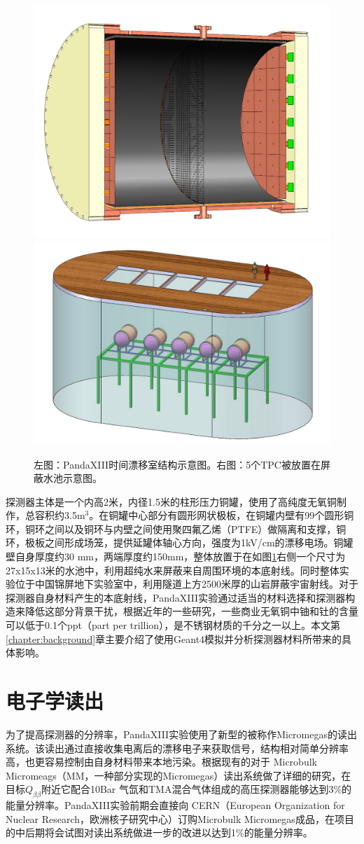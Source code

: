 \begin{figure}[tbp]
    \centering
    \includegraphics[width=0.4\columnwidth]{pic/fig1.png}
    \includegraphics[width=0.4\columnwidth]{pic/fig2.jpg}
    \caption{左图：PandaXIII时间漂移室结构示意图。右图：5个TPC被放置在屏蔽水池示意图。\supercite{cdr}}
    \label{fig:detector}
\end{figure}
    
探测器主体是一个内高2米，内径1.5米的柱形压力铜罐，使用了高纯度无氧铜制作，总容积约3.5m$^3$。在铜罐中心部分有圆形网状极板，在铜罐内壁有99个圆形铜环，铜环之间以及铜环与内壁之间使用聚四氟乙烯（PTFE）做隔离和支撑，铜环，极板之间形成场笼，提供延罐体轴心方向，强度为1kV/cm的漂移电场。铜罐壁自身厚度约30
mm，两端厚度约150mm，整体放置于在如图\ref{fig:detector}右侧一个尺寸为27x15x13米的水池中，利用超纯水来屏蔽来自周围环境的本底射线。同时整体实验位于中国锦屏地下实验室中，利用隧道上方2500米厚的山岩屏蔽宇宙射线。对于探测器自身材料产生的本底射线，PandaXIII实验通过适当的材料选择和探测器构造来降低这部分背景干扰，根据近年的一些研究，一些商业无氧铜中铀和钍的含量可以低于0.1个ppt（part per trillion）\supercite{abgrall2016majorana}，是不锈钢材质的千分之一以上。本文第\ref{chapter:background}章主要介绍了使用Geant4模拟并分析探测器材料所带来的具体影响。

\section{电子学读出}

为了提高探测器的分辨率，PandaXIII实验使用了新型的被称作Micromegas的读出系统。该读出通过直接收集电离后的漂移电子来获取信号，结构相对简单分辨率高，也更容易控制由自身材料带来本地污染。根据现有的对于 Microbulk Micromeags（MM，一种部分实现的Micromegas）读出系统做了详细的研究，在目标$Q_{\beta\beta}$附近它配合10Bar
气氙和TMA混合气体组成的高压探测器能够达到3\%的能量分辨率。PandaXIII实验前期会直接向 CERN（European Organization for Nuclear Research，欧洲核子研究中心）订购Microbulk Micromegas成品，在项目的中后期将会试图对读出系统做进一步的改进以达到1\%的能量分辨率。

